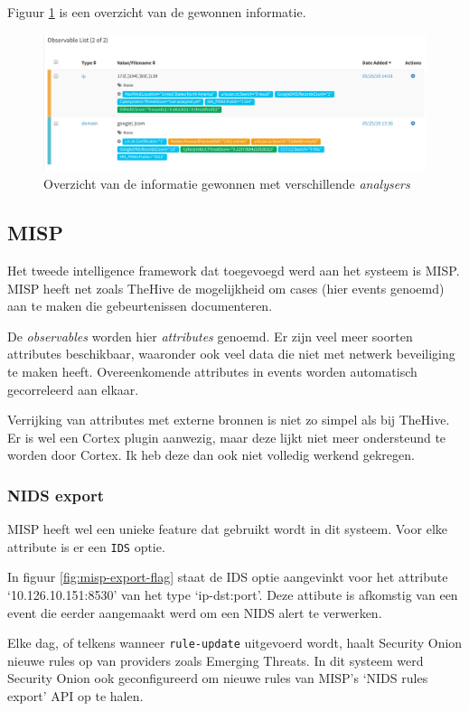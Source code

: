 \documentclass[a4paper, 12pt]{report}
\begin{document}
Figuur \ref{fig:thehive-example} is een overzicht van de gewonnen informatie.

\begin{figure}[H]
  \centering
  \includegraphics[width=\textwidth]{thehive-example}
  \caption{Overzicht van de informatie gewonnen met verschillende \emph{analysers}}
  \label{fig:thehive-example}
\end{figure}

\subsection{MISP}
Het tweede intelligence framework dat toegevoegd werd aan het systeem is MISP.
MISP heeft net zoals TheHive de mogelijkheid om cases (hier events genoemd) aan te maken die gebeurtenissen documenteren.

De \emph{observables} worden hier \emph{attributes} genoemd.
Er zijn veel meer soorten attributes beschikbaar, waaronder ook veel data die niet met netwerk beveiliging te maken heeft.
Overeenkomende attributes in events worden automatisch gecorreleerd aan elkaar.

Verrijking van attributes met externe bronnen is niet zo simpel als bij TheHive.
Er is wel een Cortex plugin aanwezig, maar deze lijkt niet meer ondersteund te worden door Cortex.
Ik heb deze dan ook niet volledig werkend gekregen.

\subsubsection{NIDS export}
\label{sec:misp-nids-export}
MISP heeft wel een unieke feature dat gebruikt wordt in dit systeem.
Voor elke attribute is er een \lstinline|IDS| optie.

In figuur \ref{fig:misp-export-flag} staat de IDS optie aangevinkt voor het attribute `10.126.10.151:8530' van het type `ip-dst:port'.
Deze attibute is afkomstig van een event die eerder aangemaakt werd om een NIDS alert te verwerken.

Elke dag, of telkens wanneer \lstinline|rule-update| uitgevoerd wordt, haalt Security Onion nieuwe rules op van providers zoals Emerging Threats.
In dit systeem werd Security Onion ook geconfigureerd om nieuwe rules van MISP's `NIDS rules export' API op te halen.
\end{document}
